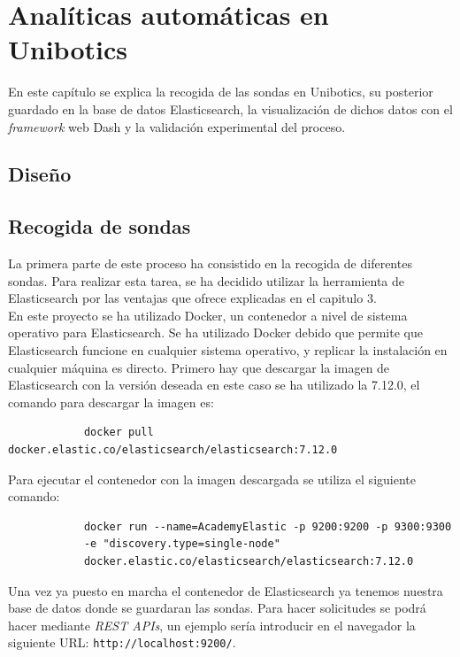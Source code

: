 \chapter{Analíticas automáticas en Unibotics}
\label{analiticas}
En este capítulo se explica la recogida de las sondas en Unibotics, su posterior guardado en la base de datos Elasticsearch, la visualización de dichos datos con el \textit{framework} web Dash y la validación experimental del proceso.

\section{Diseño}
\section{Recogida de sondas}
La primera parte de este proceso ha consistido en la recogida de diferentes sondas. Para realizar esta tarea, se ha decidido utilizar la herramienta de Elasticsearch por las ventajas que ofrece explicadas en el capitulo 3.\\

En este proyecto se ha utilizado Docker, un contenedor a nivel de sistema operativo para Elasticsearch. Se ha utilizado Docker debido que permite que Elasticsearch funcione en cualquier sistema operativo, y replicar la instalación en cualquier máquina es directo. Primero hay que descargar la imagen de Elasticsearch con la versión deseada en este caso se ha utilizado la 7.12.0, el comando para descargar la imagen es:
{\footnotesize
		\begin{verbatim}
			docker pull docker.elastic.co/elasticsearch/elasticsearch:7.12.0
		\end{verbatim}
		}
        
Para ejecutar el contenedor con la imagen descargada se utiliza el siguiente comando:

{\footnotesize
		\begin{verbatim}
			docker run --name=AcademyElastic -p 9200:9200 -p 9300:9300
            -e "discovery.type=single-node" 
            docker.elastic.co/elasticsearch/elasticsearch:7.12.0
		\end{verbatim}
		}
   \newpage   
  Una vez ya puesto en marcha el contenedor de Elasticsearch ya tenemos nuestra base de datos donde se guardaran las sondas. Para hacer solicitudes se podrá hacer mediante \textit{REST APIs}, un ejemplo sería introducir en el navegador la siguiente URL: \texttt{http://localhost:9200/}.\\
  
